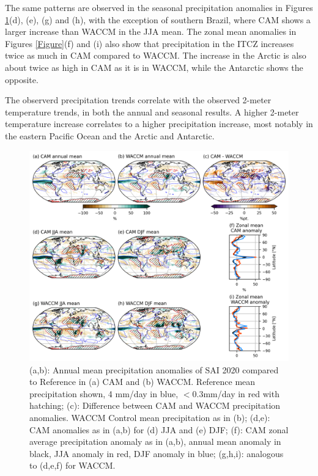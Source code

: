 The same patterns are observed in the seasonal precipitation anomalies in Figures \ref{fig:PRECT_20ref}(d), (e), (g) and (h), with the exception of southern Brazil, where CAM shows a larger increase than WACCM in the JJA mean. The zonal mean anomalies in Figures \ref{Figure}(f) and (i) also show that precipitation in the ITCZ increases twice as much in CAM compared to WACCM. The increase in the Arctic is also about twice as high in CAM as it is in WACCM, while the Antarctic shows the opposite. 

The observerd precipitation trends correlate with the observed 2-meter temperature trends, in both the annual and seasonal results. A higher 2-meter temperature increase correlates to a higher precipitation increase, most notably in the eastern Pacific Ocean and the Arctic and Antarctic. 

\begin{figure}[H]
	\centering
	\includegraphics[width=0.95\linewidth]{images/PRECT_20ref.png}
	\caption{(a,b): Annual mean precipitation anomalies of SAI 2020 compared to Reference in (a) CAM and (b) WACCM. Reference mean precipitation shown, 4 mm/day in blue, $<0.3$mm/day in red with hatching; (c): Difference between CAM and WACCM precipitation anomalies. WACCM Control mean precipitation as in (b); (d,e): CAM anomalies as in (a,b) for (d) JJA and (e) DJF; (f): CAM zonal average precipitation anomaly as in (a,b), annual mean anomaly in black, JJA anomaly in red, DJF anomaly in blue; (g,h,i): analogous to (d,e,f) for WACCM.}
	\label{fig:PRECT_20ref}
\end{figure}


